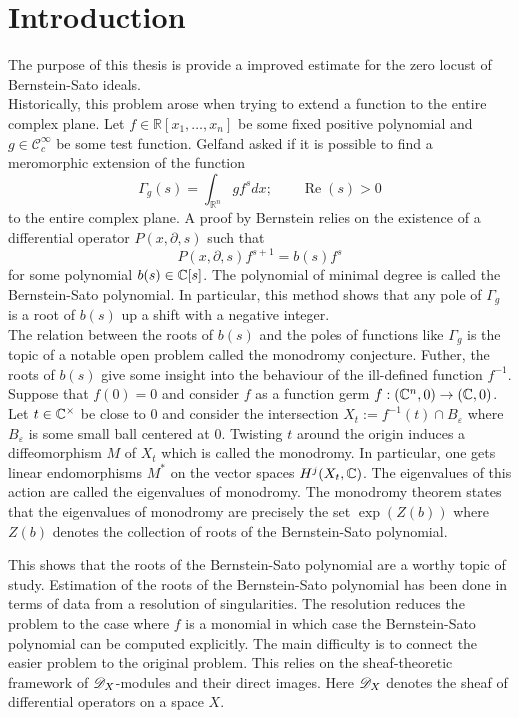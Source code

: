 \chapter*{Introduction} %



The purpose of this thesis is provide a improved estimate for the zero locust of Bernstein-Sato ideals.\\

Historically, this problem arose when trying to extend a function to the entire complex plane.
Let $f\in \mathbb{R}[x_1,\ldots,x_n]$ be some fixed positive polynomial and $g \in \mathcal{C}_c^\infty$ be some test function.
Gelfand asked if it is possible to find a meromorphic extension of the function
$$\Gamma_g(s) = \int_{\mathbb{R}^n} g f^s dx; \qquad \operatorname{Re}(s)>0 $$
to the entire complex plane.
A proof by Bernstein relies on the existence of a differential operator $P(x,\partial, s)$ such that
$$P(x,\partial,s) f^{s+1} = b(s) f^s$$
for some polynomial $b(s)\in \mathbb{C}[s]$.
The polynomial of minimal degree is called the Bernstein-Sato polynomial.
In particular, this method shows that any pole of $\Gamma_g$ is a root of $b(s)$ up a shift with a negative integer.\\

The relation between the roots of $b(s)$ and the poles of functions like $\Gamma_g$ is the topic of a notable open problem called the monodromy conjecture.
Futher, the roots of $b(s)$ give some insight into the behaviour of the ill-defined function $f^{-1}$.
Suppose that $f(0)= 0$ and consider $f$ as a function germ $f:(\mathbb{C}^n,0)\to (\mathbb{C},0)$.
Let $t\in \mathbb{C}^\times$ be close to $0$ and consider the intersection $X_t := f^{-1}(t)\cap B_\varepsilon$ where $B_\varepsilon$ is some small ball centered at $0$.
Twisting $t$ around the origin induces a diffeomorphism $M$ of $X_t$ which is called the monodromy.
In particular, one gets linear endomorphisms $M^*$ on the vector spaces $H^j(X_t,\mathbb{C})$.
The eigenvalues of this action are called the eigenvalues of monodromy.
The monodromy theorem states that the eigenvalues of monodromy are precisely the set $\exp(Z(b))$ where $Z(b)$ denotes the collection of roots of the Bernstein-Sato polynomial.

This shows that the roots of the Bernstein-Sato polynomial are a worthy topic of study.
Estimation of the roots of the Bernstein-Sato polynomial has been done in terms of data from a resolution of singularities.
The resolution reduces the problem to the case where $f$ is a monomial in which case the Bernstein-Sato polynomial can be computed explicitly.
The main difficulty is to connect the easier problem to the original problem.
This relies on the sheaf-theoretic framework of $\mathscr{D}_X$-modules and their direct images.
Here $\mathscr{D}_X$ denotes the sheaf of differential operators on a space $X$.

